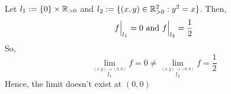 Let $ l_1 := \{0\}\times\mathbb{R}_{>0} $ and $ l_2 := \{(x,y) \in \mathbb{R}_{>0}^2 : y^2=x \} $.
Then, 
$$
f\Big|_{l_1} = 0 \ {\rm and} \ f\Big|_{l_2} = \frac{1}{2}
$$
So,
\[
  \lim_{\stackrel{(x,y) \to (0,0)}{l_1}} f = 0 \not= \lim_{\stackrel{(x,y) \to (0,0)}{l_2}} f = \frac{1}{2}
\]
Hence, the limit doesn't exist at $ (0,0) $ 
